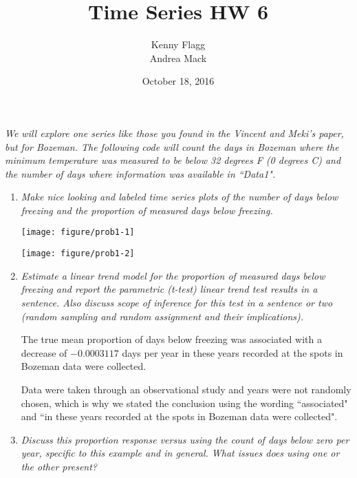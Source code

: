 \documentclass[11pt]{article}\usepackage[]{graphicx}\usepackage[]{color}
\title{Time Series HW 6}
\author{Kenny Flagg \\ Andrea Mack}
\date{October 18, 2016}
\makeatletter
\def\maxwidth{ %
  \ifdim\Gin@nat@width>\linewidth
    \linewidth
  \else
    \Gin@nat@width
  \fi
}
\newenvironment{knitrout}{}{} %
\makeatother
\begin{document}
\maketitle



{\it We will explore one series like those you found in the Vincent and Meki's paper, but for Bozeman. The following code will count the days in Bozeman where the minimum temperature was measured to be below 32 degrees F (0 degrees C) and the number of days where information was available in ``Data1". }


\begin{enumerate}

\item%
{\it Make nice looking and labeled time series plots of the number of days below freezing and the proportion of measured days below freezing.}

\begin{knitrout}\footnotesize
{}\color{fgcolor}

{\centering \texttt{[image: figure/prob1-1]} 

}




{\centering \texttt{[image: figure/prob1-2]} 

}



\end{knitrout}


\item%
{\it Estimate a linear trend model for the proportion of measured days below freezing and report the parametric (t-test) linear trend test results in a sentence. Also discuss scope of inference for this test in a sentence or two (random sampling and random assignment and their implications).}



The true mean proportion of days below freezing was associated with a decrease of \ensuremath{-0.0003117} days per year in these years recorded at the spots in Bozeman data were collected.

Data were taken through an observational study and years were not randomly chosen, which is why we stated the conclusion using the wording ``associated" and ``in these years recorded at the spots in Bozeman data were collected". %

\item%
{\it Discuss this proportion response versus using the count of days below zero per year, specific to this example and in general. What issues does using one or the other present?}


\end{enumerate}
\end{document}
